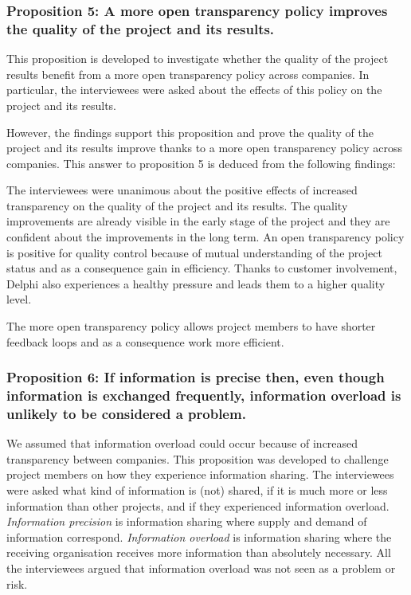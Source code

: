 \subsubsection{Proposition 5: A more open transparency policy improves the quality of the project and its results.}

This proposition is developed to investigate whether the quality of the project results benefit from a more open transparency policy across companies. In particular, the interviewees were asked about the effects of this policy on the project and its results.

However, the findings support this proposition and prove the quality of the project and its results improve thanks to a more open transparency policy across companies. This answer to proposition 5 is deduced from the following findings:

 The interviewees were unanimous about the positive effects of increased transparency on the quality of the project and its results. The quality improvements are already visible in the early stage of the project and they are confident about the improvements in the long term. An open transparency policy is positive for quality control because of mutual understanding of the project status and as a consequence gain in efficiency. Thanks to customer involvement, Delphi also experiences a healthy pressure and leads them to a higher quality level.

 The more open transparency policy allows project members to have shorter feedback loops and as a consequence work more efficient.

\subsubsection{Proposition 6: If information is precise then, even though information is exchanged frequently, information overload is unlikely to be considered a problem.}

We assumed that information overload could occur because of increased transparency between companies. This proposition was developed to challenge project members on how they experience information sharing. The interviewees were asked what kind of information is (not) shared, if it is much more or less information than other projects, and if they experienced information overload. {\em Information precision} is information sharing where supply and demand of information correspond. {\em Information overload} is information sharing where the receiving organisation receives more information than absolutely necessary. All the interviewees argued that information overload was not seen as a problem or risk.

